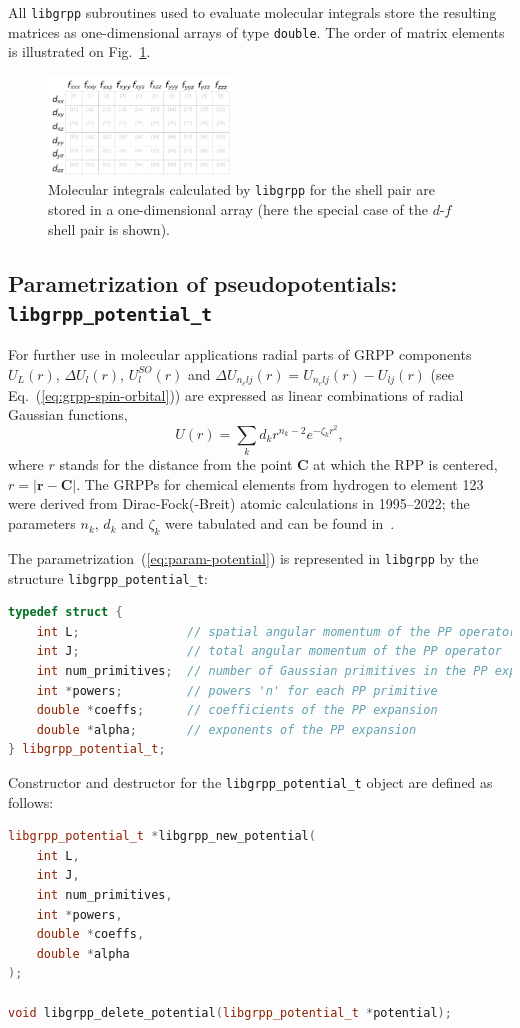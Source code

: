 \documentclass[12pt]{article}
\begin{document}
All \texttt{libgrpp} subroutines used to evaluate molecular integrals store the resulting matrices as one-dimensional arrays of type \texttt{double}. The order of matrix elements is illustrated on Fig.~\ref{fig:dfmatrix}.

\begin{figure}
\center
\includegraphics[width=0.45\textwidth]{d-f-matrix.pdf}
\caption{Molecular integrals calculated by \texttt{libgrpp} for the shell pair are stored in a one-dimensional array (here the special case of the $d$-$f$ shell pair is shown).}
\label{fig:dfmatrix}
\end{figure}


\subsection{Parametrization of pseudopotentials: \texttt{libgrpp\_potential\_t}}

For further use in molecular applications radial parts of GRPP components $U_L(r)$, $\Delta U_l(r)$, $U^{SO}_l(r)$ and $\Delta U_{n_clj}(r) = U_{n_clj}(r)-U_{lj}(r)$ (see Eq.~(\ref{eq:grpp-spin-orbital})) are expressed as linear combinations of radial Gaussian functions,
\begin{equation}
U(r) = \sum_k d_k r^{n_k-2} e^{-\zeta_k r^2},
\label{eq:param-potential}
\end{equation}
where $r$ stands for the distance from the point $\bm{C}$ at which the RPP is centered, $r = |\bm{r} - \bm{C}|$. The GRPPs for chemical elements from hydrogen to element 123 were derived from Dirac-Fock(-Breit) atomic calculations
in 1995--2022; the parameters $n_k$, $d_k$ and $\zeta_k$ were tabulated and can be found in~\cite{GRPP_website}.

The parametrization~(\ref{eq:param-potential}) is represented in \texttt{libgrpp} by the structure \texttt{libgrpp\_potential\_t}:
%
\begin{lstlisting}[language=C++]
typedef struct {
    int L;               // spatial angular momentum of the PP operator
    int J;               // total angular momentum of the PP operator
    int num_primitives;  // number of Gaussian primitives in the PP expansion
    int *powers;         // powers 'n' for each PP primitive
    double *coeffs;      // coefficients of the PP expansion
    double *alpha;       // exponents of the PP expansion
} libgrpp_potential_t;
\end{lstlisting}
%
Constructor and destructor for the \texttt{libgrpp\_potential\_t} object are defined as follows:
%
\begin{lstlisting}[language=C++]
libgrpp_potential_t *libgrpp_new_potential(
    int L,
    int J,
    int num_primitives,
    int *powers,
    double *coeffs,
    double *alpha
);

void libgrpp_delete_potential(libgrpp_potential_t *potential);
\end{lstlisting}
\end{document}
